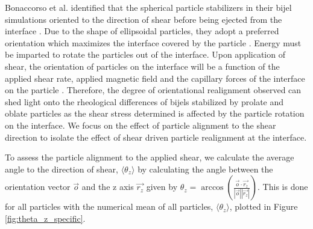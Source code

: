 Bonaccorso et al. identified that the spherical particle stabilizers in their bijel simulations oriented to the direction of shear before being
ejected from the interface \cite{bonaccorso_shear_2020}. Due to the shape of ellipsoidal particles, they adopt a preferred orientation which
maximizes the interface covered by the particle \cite{davies_dipolar_2015, davies_interface_2014}. Energy must be imparted to rotate the particles
out of the interface. Upon application of shear, the orientation of particles on the interface will be a function of the applied shear rate, 
applied magnetic field and the capillary forces of the interface on the particle \cite{cao_modeling_2021, chhabra_drag_1999, brenner_stokes_1963, naga_capillary_2021}.
Therefore, the degree of orientational realignment observed can shed light onto the rheological 
differences of bijels stabilized by prolate and oblate particles as the shear stress determined is affected by the particle rotation on the interface. We focus on
the effect of particle alignment to the shear direction to isolate the effect of shear driven particle realignment at the interface. 

To assess the particle alignment to the applied shear, we calculate the average angle to the direction of shear, $\langle \theta_z \rangle$ by calculating the angle 
between the orientation vector $\vec{o}$ and the z axis $\vec{r_z}$ given by $\theta_z = \arccos(\frac{ \vec{o} \cdot \vec{r_z} }{ |\vec{o}| |\vec{r_z}| })$. 
This is done for all particles with the numerical mean of all particles, $\langle \theta_z \rangle$, plotted in Figure \ref{fig:theta_z_specific}.


